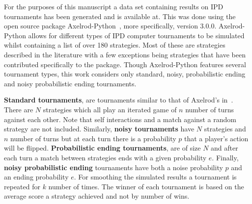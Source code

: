 \documentclass{article}
\begin{document}
For the purposes of this manuscript a data set containing results on IPD tournaments
has been generated and is available at. This
was done using the open source package Axelrod-Python~\cite{axelrodproject},
more specifically, version 3.0.0. Axelrod-Python allows for different types of
IPD computer tournaments to be simulated whilst
containing a list of over 180 strategies. Most of these are strategies described
in the literature with a few exceptions being strategies that have been
contributed specifically to the package. Though Axelrod-Python features several
tournament types, this work considers only standard, noisy, probabilistic ending
and noisy probabilistic ending tournaments.

\textbf{Standard tournaments}, are tournaments similar to that of Axelrod's
in~\cite{Axelrod1980a}. There are \(N\) strategies which all play an iterated
game of \(n\) number of turns against each other. Note that self interactions
and a match against a random strategy are not included. Similarly, \textbf{noisy
tournaments} have \(N\) strategies and \(n\) number of turns but at each turn
there is a probability \(p\) that a player's action will be flipped.
\textbf{Probabilistic ending tournaments}, are of size \(N\) and after each turn
a match between strategies ends with a given probability \(e\). Finally,
\textbf{noisy probabilistic ending} tournaments have both a noise probability
\(p\) and an ending probability \(e\). For smoothing the simulated results a
tournament is repeated for \(k\) number of times. The winner of each tournament
is based on the average score a strategy achieved and not by number of wins.


\end{document}
